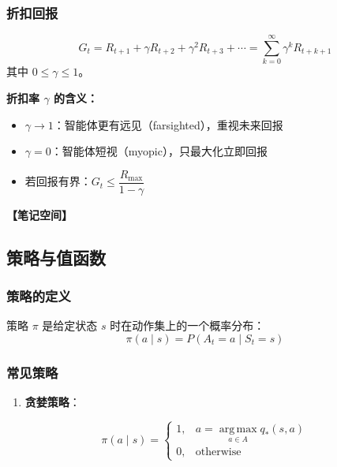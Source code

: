 \documentclass[12pt,a4paper]{article}
\newcommand{\notespace}[1][3cm]{%
  \vspace{#1}%
  \noindent\textbf{【笔记空间】}%
  \vspace{#1}%
}
\newcommand{\1}{\mathbf{1}}
\newcommand{\argmax}{\operatorname*{arg\,max}}
\begin{document}
\subsubsection*{折扣回报}

\begin{equation}
G_t = R_{t+1}+\gamma R_{t+2}+\gamma^2 R_{t+3}+\cdots = \sum_{k=0}^{\infty}\gamma^k R_{t+k+1}
\end{equation}
其中 $0 \le \gamma \le 1$。

\begin{keybox}
\textbf{折扣率 $\gamma$ 的含义：}
\begin{itemize}[leftmargin=1.5em]
  \item $\gamma \to 1$：智能体更有远见（farsighted），重视未来回报
  \item $\gamma=0$：智能体短视（myopic），只最大化立即回报
  \item 若回报有界：$G_t \le \dfrac{R_{\max}}{1-\gamma}$
\end{itemize}
\end{keybox}

\notespace[2cm]

\subsection{策略与值函数}

\subsubsection*{策略的定义}

策略 $\pi$ 是给定状态 $s$ 时在动作集上的一个概率分布：
\begin{equation}
\pi(a\mid s)=P(A_t=a\mid S_t=s)
\end{equation}

\subsubsection*{常见策略}

\begin{enumerate}[leftmargin=2em]
  \item \textbf{贪婪策略}：
\end{enumerate}

\begin{equation}
\pi(a\mid s)= \begin{cases} 1, & a=\argmax_{a\in A} q_*(s,a) \\ 0, & \text{otherwise} \end{cases}
\end{equation}
\end{document}
